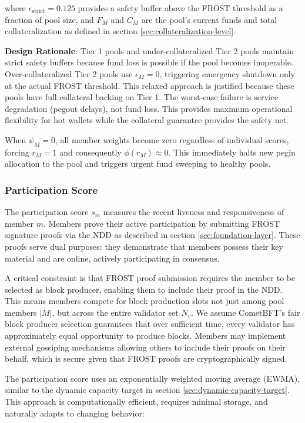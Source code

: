 where $\epsilon_{\text{strict}} = 0.125$ provides a safety buffer above the FROST threshold as a fraction of pool size, and $F_M$ and $C_M$ are the pool's current funds and total collateralization as defined in section \ref{sec:collateralization-level}.

\textbf{Design Rationale}: Tier 1 pools and under-collateralized Tier 2 pools maintain strict safety buffers because fund loss is possible if the pool becomes inoperable. Over-collateralized Tier 2 pools use $\epsilon_M = 0$, triggering emergency shutdown only at the actual FROST threshold. This relaxed approach is justified because these pools have full collateral backing on Tier 1. The worst-case failure is service degradation (pegout delays), not fund loss. This provides maximum operational flexibility for hot wallets while the collateral guarantee provides the safety net.

When $\psi_M = 0$, all member weights become zero regardless of individual scores, forcing $r_M = 1$ and consequently $\phi(r_M) \approx 0$. This immediately halts new pegin allocation to the pool and triggers urgent fund sweeping to healthy pools.

\subsubsection{Participation Score}
\label{sec:participation-score}

The participation score $s_m$ measures the recent liveness and responsiveness of member $m$. Members prove their active participation by submitting FROST signature proofs via the NDD as described in section \ref{sec:foundation-layer}. These proofs serve dual purposes: they demonstrate that members possess their key material and are online, actively participating in consensus.

A critical constraint is that FROST proof submission requires the member to be selected as block producer, enabling them to include their proof in the NDD. This means members compete for block production slots not just among pool members $|M|$, but across the entire validator set $N_v$. We assume CometBFT's fair block producer selection guarantees that over sufficient time, every validator has approximately equal opportunity to produce blocks. Members may implement external gossiping mechanisms allowing others to include their proofs on their behalf, which is secure given that FROST proofs are cryptographically signed.

The participation score uses an exponentially weighted moving average (EWMA), similar to the dynamic capacity target in section \ref{sec:dynamic-capacity-target}. This approach is computationally efficient, requires minimal storage, and naturally adapts to changing behavior:

